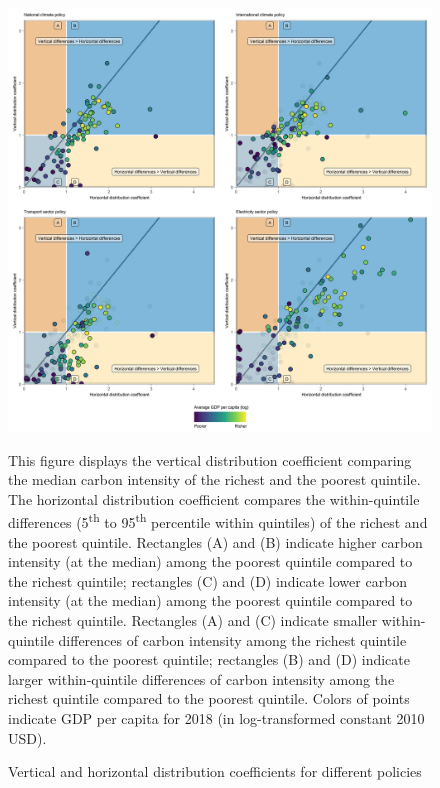 \documentclass[12pt, a4paper]{article}
\newenvironment{subcaption2}
{\strut
\vspace{-5pt}
\begin{minipage}[b]{0.9\textwidth}
  \hspace*{-\parindent}
  \footnotesize}
 {\end{minipage}}
\begin{document}
\begin{refsection}
\clearpage


\clearpage


\clearpage


\clearpage

\begin{figure}[ht!]
    \centering
    \caption{Vertical and horizontal distribution coefficients for different policies}
    \includegraphics[width=\textwidth]{1_Figures/Figure 2/Figure_2_2017_Policy.jpg}
    \label{fig:comparison_policies}
    \begin{subcaption2}
    This figure displays the vertical distribution coefficient comparing the median carbon intensity of the richest and the poorest quintile. The horizontal distribution coefficient compares the within-quintile differences (5\textsuperscript{th} to 95\textsuperscript{th} percentile within quintiles) of the richest and the poorest quintile. Rectangles (A) and (B) indicate higher carbon intensity (at the median) among the poorest quintile compared to the richest quintile; rectangles (C) and (D) indicate lower carbon intensity (at the median) among the poorest quintile compared to the richest quintile. Rectangles (A) and (C) indicate smaller within-quintile differences of carbon intensity among the richest quintile compared to the poorest quintile; rectangles (B) and (D) indicate larger within-quintile differences of carbon intensity among the richest quintile compared to the poorest quintile. Colors of points indicate GDP per capita for 2018 (in log-transformed constant 2010 USD).
    

\end{subcaption2}
\end{figure}
\end{refsection}
\end{document}
